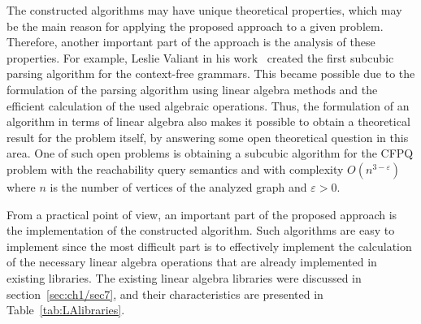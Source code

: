 The constructed algorithms may have unique theoretical properties, which may be the main reason for applying the proposed approach to a given problem. Therefore, another important part of the approach is the analysis of these properties. For example, Leslie Valiant in his work~\cite{valiant1975general} created the first subcubic parsing algorithm for the context-free grammars. This became possible due to the formulation of the parsing algorithm using linear algebra methods and the efficient calculation of the used algebraic operations. Thus, the formulation of an algorithm in terms of linear algebra also makes it possible to obtain a theoretical result for the problem itself, by answering some open theoretical question in this area. One of such open problems is obtaining a subcubic algorithm for the CFPQ problem with the reachability query semantics and with complexity $O(n^{3 - \varepsilon})$ where $n$ is the number of vertices of the analyzed graph and $\varepsilon > 0$.

From a practical point of view, an important part of the proposed approach is the implementation of the constructed algorithm. Such algorithms are easy to implement since the most difficult part is to effectively implement the calculation of the necessary linear algebra operations that are already implemented in existing libraries. The existing linear algebra libraries were discussed in section~\ref{sec:ch1/sec7}, and their characteristics are presented in Table~\ref{tab:LAlibraries}.

